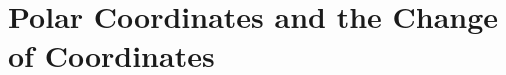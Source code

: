 \documentclass[a4paper, 11pt]{article}
\begin{document}
\maketitle
\thispagestyle{firstpage}

\setcounter{section}{11}
\setcounter{question}{106}

\section{Polar Coordinates and the Change of Coordinates}

\end{document}
